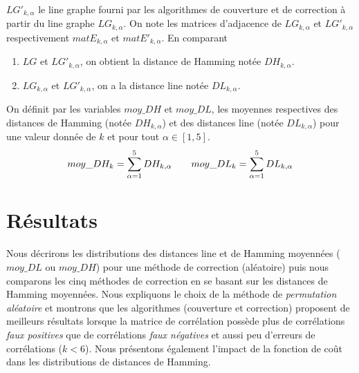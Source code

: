 \documentclass[onecolumn, 12pt]{book}
\begin{document}
 $LG'_{k, \alpha}$  le line graphe fourni par les algorithmes de couverture et de correction \`a partir du line graphe $LG_{k, \alpha}$.
 \newline
 On note les matrices d'adjacence de $LG_{k, \alpha}$ et $LG'_{k, \alpha}$ respectivement $matE_{k, \alpha}$ et $matE'_{k, \alpha}$.
\newline
En comparant
\begin{enumerate}
\item  $LG$ et $LG'_{k, \alpha}$, on obtient la distance de Hamming not\'ee $DH_{k,\alpha}$.
\item $LG_{k,\alpha}$ et $LG'_{k,\alpha}$, on a la distance line not\'ee $DL_{k,\alpha}$.
\end{enumerate}
On d\'efinit par les variables $moy\_DH$ et $moy\_DL$, les moyennes respectives des distances de Hamming (not\'ee $DH_{k,\alpha}$) et des distances line (not\'ee $DL_{k,\alpha}$) pour une valeur donn\'ee de $k$ et pour tout $\alpha \in [1, 5]$.
\begin{equation}
moy\_DH_k = \sum_{\alpha = 1}^{5} DH_{k, \alpha} \hspace{2 em}
moy\_DL_k = \sum_{\alpha = 1}^{5} DL_{k, \alpha}
\end{equation}

  
\section{R\'esultats}
Nous d\'ecrirons les distributions des distances line et de Hamming moyenn\'ees ($moy\_DL$ ou $moy\_DH$) pour une m\'ethode de correction (al\'eatoire) puis nous comparons les cinq m\'ethodes de correction en se basant sur les distances de Hamming moyenn\'ees. 
Nous expliquons le choix de la m\'ethode de {\em permutation al\'eatoire} et montrons que les algorithmes (couverture et correction) proposent de meilleurs r\'esultats lorsque la matrice de corr\'elation poss\`ede plus de corr\'elations {\em faux positives} que de corr\'elations {\em faux n\'egatives} et aussi peu d'erreurs de corr\'elations ($k < 6$). 
\newline
Nous pr\'esentons \'egalement l'impact de la fonction de co\^ut dans les distributions  de distances de Hamming.
\end{document}
